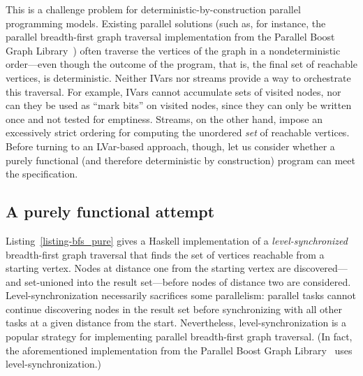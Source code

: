This is a challenge problem for deterministic-by-construction parallel
programming models. Existing parallel solutions (such as, for instance, the
parallel breadth-first graph traversal implementation from the
Parallel Boost Graph Library~) often traverse the
vertices of the graph in a nondeterministic order---even though the
outcome of the program, that is, the final set of reachable vertices, is
deterministic.  Neither IVars nor streams provide a way 
to orchestrate this traversal.  For
example, IVars cannot accumulate sets of visited nodes, nor can they
be used as ``mark bits'' on visited nodes, since they can only be
written once and not tested for emptiness.  Streams, on the other
hand, impose an excessively strict ordering for computing the
unordered \emph{set} of reachable vertices.
Before turning to an LVar-based approach, though, let us consider
whether a purely functional (and therefore deterministic by
construction) program can meet the specification.

\subsection{A purely functional attempt}

\singlespacing

\doublespacing

Listing~\ref{listing-bfs_pure} gives a Haskell implementation of a
\emph{level-synchronized} breadth-first graph traversal that finds the
set of vertices reachable from a starting vertex.  Nodes at
distance one from the starting vertex are discovered---and set-unioned
into the result set---before nodes of distance two are
considered.  Level-synchronization necessarily sacrifices some
parallelism: parallel tasks cannot continue discovering nodes in the
result set before synchronizing with all other tasks at a given
distance from the start.  Nevertheless, level-synchronization is a
popular strategy for implementing parallel breadth-first graph
traversal.  (In fact, the aforementioned implementation from the
Parallel Boost Graph Library~ uses
level-synchronization.)

